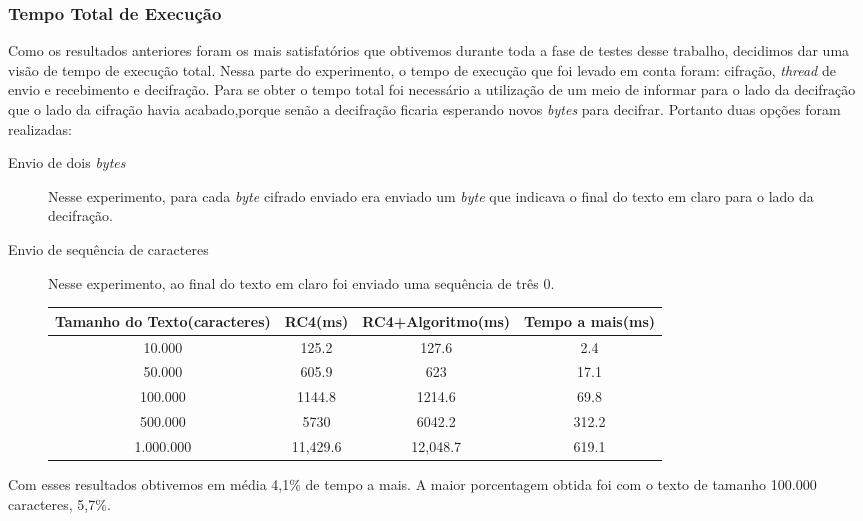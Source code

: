 \subsubsection{Tempo Total de Execução}

Como os resultados anteriores foram os mais satisfatórios que obtivemos durante toda a fase de testes desse trabalho, decidimos dar uma visão de tempo de execução total. Nessa parte do experimento, o tempo de execução que foi levado em conta foram: cifração, \textit{thread} de envio e recebimento e decifração. Para se obter o tempo total foi necessário a utilização de um meio de informar para o lado da decifração que o lado da cifração havia acabado,porque senão a decifração ficaria esperando novos \textit{bytes} para decifrar. Portanto duas opções foram realizadas:

\begin{description}
	\item [Envio de dois \textit{bytes}] Nesse experimento, para cada \textit{byte} cifrado enviado era enviado um \textit{byte} que indicava o final do texto em claro para o lado da decifração.
	
	\item[Envio de sequência de caracteres] Nesse experimento, ao final do texto em claro foi enviado uma sequência de três 0.
	
\begin{table}[h]
\begin{tabular}{|c|c|c|c|}
\hline
Tamanho do Texto(caracteres) & RC4(ms)  & RC4+Algoritmo(ms) & Tempo a mais(ms) \\ \hline
10.000                       & 125.2    & 127.6             & 2.4              \\ \hline
50.000                       & 605.9    & 623               & 17.1             \\ \hline
100.000                      & 1144.8   & 1214.6            & 69.8             \\ \hline
500.000                      & 5730     & 6042.2            & 312.2            \\ \hline
1.000.000                    & 11,429.6 & 12,048.7          & 619.1            \\ \hline
\end{tabular}
\end{table}
\end{description}

Com esses resultados obtivemos em média 4,1\% de tempo a mais. A maior porcentagem obtida foi com o texto de tamanho 100.000 caracteres, 5,7\%.

